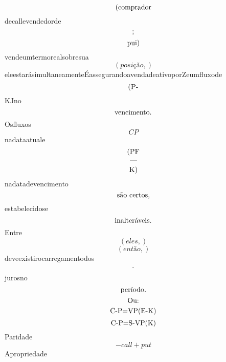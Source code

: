 \documentclass{article}
\begin{document}
\begin{equation}
$(comprador$
\end{equation}decallevendedorde\begin{equation}
$;$
\end{equation}\begin{equation}
$pui)$
\end{equation}vendeumtermorealsobresua\begin{equation}
\left( posição,\right)
\end{equation}eleestarásimultaneamenteÉassegurandoavendadeativoporZeumfluxode\begin{equation}
$(P-$
\end{equation}KJno\begin{equation}
$vencimento.$
\end{equation}Osfluxos\begin{equation}
CP
\end{equation}nadataatuale\begin{equation}
$(PF$
\end{equation}\begin{equation}
—
\end{equation}\begin{equation}
$K)$
\end{equation}nadatadevencimento\begin{equation}
$são certos,$
\end{equation}estabelecidose\begin{equation}
$inalteráveis.$
\end{equation}Entre\begin{equation}
\left( eles,\right)
\end{equation}\begin{equation}
\left( então,\right)
\end{equation}deveexistirocarregamentodos\begin{equation}
$.$
\end{equation}jurosno\begin{equation}
$período.$
\end{equation}\begin{equation}
$Ou:$
\end{equation}\begin{equation}
$C-P=VP(E-K)$
\end{equation}\begin{equation}
$C-P=S-VP(K)$
\end{equation}Paridade\begin{equation}
- call + put
\end{equation}Apropriedade\begin{equation}

\end{equation}
\end{document}
